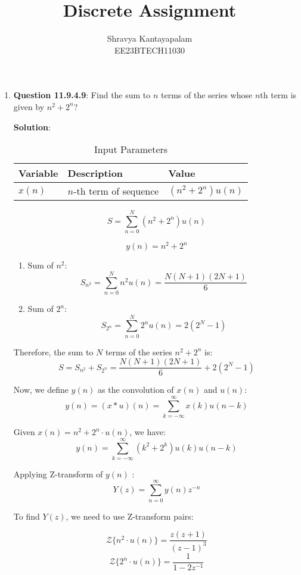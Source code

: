 \documentclass[journal,12pt,onecolumn]{IEEEtran}
\theoremstyle{remark}
\begin{document}
\title{Discrete Assignment}
\author{Shravya Kantayapalam\\ EE23BTECH11030}
\maketitle

\begin{enumerate}
    \item \textbf{Question 11.9.4.9}:
    Find the sum to $n$ terms of the series whose $n$th term is given by $n^2 + 2^n$?
    
    \textbf{Solution}:
   

\begin{table}[htbp]
    \centering
    \caption{Input Parameters}
    \begin{tabular}{|l|l|l|}
    \hline
    \textbf{Variable} & \textbf{Description} & \textbf{Value} \\
    \hline
    \( x(n) \) & \( n \)-th term of sequence & \( (n^2 + 2^n)u(n) \) \\
    \hline
    \end{tabular}
\end{table}

\[
S = \sum_{n=0}^{N} (n^2 + 2^n)u(n)
\]

\[
y(n) = n^2 + 2^n
\]

\begin{enumerate}
    \item Sum of \( n^2 \):
    \[
    S_{n^2} = \sum_{n=0}^{N} n^2 u(n) = \frac{N(N + 1)(2N + 1)}{6}
    \]
    
    \item Sum of \( 2^n \):
    \[
    S_{2^n} = \sum_{n=0}^{N} 2^n u(n) = 2(2^N - 1)
    \]
\end{enumerate}

Therefore, the sum to \( N \) terms of the series \( n^2 + 2^n \) is:
\[
S = S_{n^2} + S_{2^n} = \frac{N(N + 1)(2N + 1)}{6} + 2(2^N - 1)
\]

Now, we define \( y(n) \) as the convolution of \( x(n) \) and \( u(n) \):
\[ y(n) = (x * u)(n) = \sum_{k=-\infty}^{\infty} x(k)u(n-k) \]

Given \( x(n) = n^2 + 2^n \cdot u(n) \), we have:
\[ y(n) = \sum_{k=-\infty}^{\infty} (k^2 + 2^k)u(k)u(n-k) \]

Applying Z-transform of \( y(n) \) :
\[ Y(z) = \sum_{n=0}^{\infty} y(n)z^{-n} \]

To find \( Y(z) \), we need to use Z-transform pairs:

\[
\mathcal{Z}\{n^2 \cdot u(n)\} = \frac{z(z + 1)}{(z - 1)^3}
\]
\[
\mathcal{Z}\{2^n \cdot u(n)\} = \frac{1}{1 - 2z^{-1}}
\]


\end{enumerate}
\end{document}
